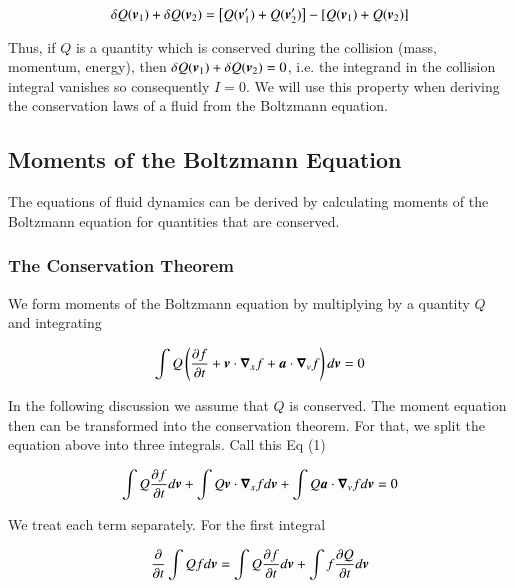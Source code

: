 \begin{equation}
\delta Q({\boldsymbol{v}}_1)+ \delta Q({\boldsymbol{v}}_2) = \left[Q({\boldsymbol{v}}_1^\prime)+ Q({\boldsymbol{v}}_2^\prime)\right]  -\left[Q({\boldsymbol{v}}_1)+ Q({\boldsymbol{v}}_2)\right] 
\end{equation}

 \noindent  Thus, if $Q$ is a quantity which is conserved during the collision (mass, momentum, energy), then $\delta Q({\boldsymbol{v}}_1)+ \delta Q({\boldsymbol{v}}_2) = 0$, i.e. the integrand in the collision integral vanishes so consequently $I = 0$. We will use this property when deriving the conservation laws of a fluid from the Boltzmann equation.

\subsection{Moments of the Boltzmann Equation}

The equations of fluid dynamics can be derived by calculating moments of the Boltzmann equation for quantities that are conserved.

\subsubsection{The Conservation Theorem}

We form moments of the Boltzmann equation by multiplying by a quantity $Q$ and integrating 

\begin{equation}
\int Q \left( \frac{\partial f}{\partial t} + {\boldsymbol{v}}\cdot{\boldsymbol{\nabla}}_x f + {\boldsymbol{a}}\cdot{\boldsymbol{\nabla}}_v f \right) d{\boldsymbol{v}}  = 0
\end{equation}

In the following discussion we assume that $Q$ is conserved. The moment equation then can be transformed into the conservation theorem. For that, we split the equation above into three integrals. Call this Eq (1)  

\begin{equation}
\int Q \frac{\partial f}{\partial t}d{\boldsymbol{v}}  + \int Q{\boldsymbol{v}}\cdot{\boldsymbol{\nabla}}_x f  d{\boldsymbol{v}} + \int Q {\boldsymbol{a}}\cdot{\boldsymbol{\nabla}}_v f d{\boldsymbol{v}}  = 0  
\label{eq:eq1-cons}
\end{equation}

\noindent We treat each term separately. For the first integral 

\begin{equation}
\frac{\partial }{\partial t}  \int Q f d{\boldsymbol{v}}  =  \int Q \frac{\partial f}{\partial t} d{\boldsymbol{v}} + \int f \frac{\partial Q}{\partial t} d{\boldsymbol{v}}  
\end{equation}

